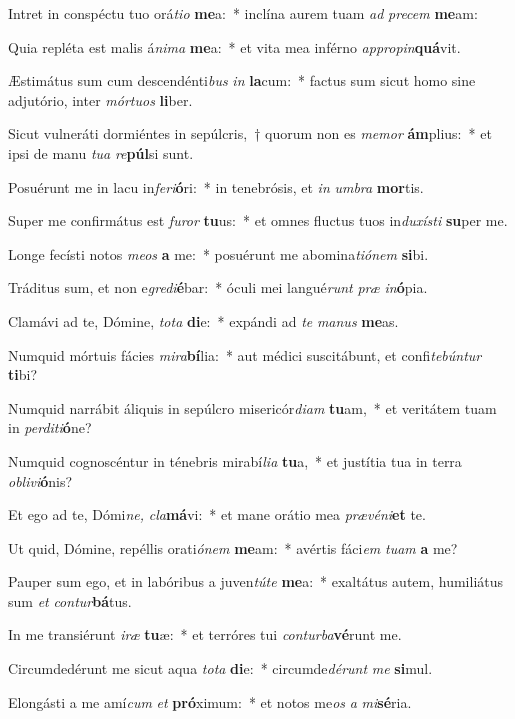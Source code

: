 \item Intret in conspéctu tuo orá\textit{tio} \textbf{me}a:~* inclína aurem tuam \textit{ad} \textit{precem} \textbf{me}am:
\item Quia repléta est malis á\textit{nima} \textbf{me}a:~* et vita mea inférno \textit{appropin}\textbf{quá}vit.
\item Æstimátus sum cum descendénti\textit{bus} \textit{in} \textbf{la}cum:~* factus sum sicut homo sine adjutório, inter \textit{mórtuos} \textbf{li}ber.
\item Sicut vulneráti dormiéntes in sepúlcris,~† quorum non es \textit{memor} \textbf{ám}plius:~* et ipsi de manu \textit{tua} \textit{re}\textbf{púl}si sunt.
\item Posuérunt me in lacu in\textit{feri}\textbf{ó}ri:~* in tenebrósis, et \textit{in} \textit{umbra} \textbf{mor}tis.
\item Super me confirmátus est \textit{furor} \textbf{tu}us:~* et omnes fluctus tuos in\textit{duxísti} \textbf{su}per me.
\item Longe fecísti notos \textit{meos} \textbf{a} me:~* posuérunt me abomina\textit{tiónem} \textbf{si}bi.
\item Tráditus sum, et non e\textit{gredi}\textbf{é}bar:~* óculi mei langué\textit{runt} \textit{præ} \textit{in}\textbf{ó}pia.
\item Clamávi ad te, Dómine, \textit{tota} \textbf{di}e:~* expándi ad \textit{te} \textit{manus} \textbf{me}as.
\item Numquid mórtuis fácies \textit{mira}\textbf{bí}lia:~* aut médici suscitábunt, et confi\textit{tebúntur} \textbf{ti}bi?
\item Numquid narrábit áliquis in sepúlcro misericór\textit{diam} \textbf{tu}am,~* et veritátem tuam in \textit{perditi}\textbf{ó}ne?
\item Numquid cognoscéntur in ténebris mirabí\textit{lia} \textbf{tu}a,~* et justítia tua in terra \textit{oblivi}\textbf{ó}nis?
\item Et ego ad te, Dómi\textit{ne,} \textit{cla}\textbf{má}vi:~* et mane orátio mea \textit{prævéni}\textbf{et} te.
\item Ut quid, Dómine, repéllis orati\textit{ónem} \textbf{me}am:~* avértis fáci\textit{em} \textit{tuam} \textbf{a} me?
\item Pauper sum ego, et in labóribus a juven\textit{túte} \textbf{me}a:~* exaltátus autem, humiliátus sum \textit{et} \textit{contur}\textbf{bá}tus.
\item In me transiérunt \textit{iræ} \textbf{tu}æ:~* et terróres tui \textit{conturba}\textbf{vé}runt me.
\item Circumdedérunt me sicut aqua \textit{tota} \textbf{di}e:~* circumde\hspace{0.02em}\textit{dérunt} \textit{me} \textbf{si}mul.
\item Elongásti a me amí\textit{cum} \textit{et} \textbf{pró}ximum:~* et notos me\textit{os} \textit{a} \textit{mi}\textbf{sé}ria.
